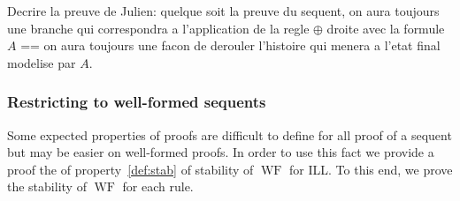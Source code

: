 \documentclass[runningheads,a4paper]{llncs}
\DeclareMathOperator{\wf}{WF}
\begin{document}
Decrire la preuve de Julien: quelque soit la preuve du sequent, on aura toujours une branche qui correspondra a l'application de la regle $\oplus$ droite avec la formule $A$ == on aura toujours une facon de derouler l'histoire qui menera a l'etat final modelise par $A$.

\subsubsection{Restricting to well-formed sequents}
\label{sec:restrict}

Some expected properties of proofs are difficult to define for all
proof of a sequent but may be easier on well-formed proofs. In order
to use this fact we provide a proof the of property~\ref{def:stab} of
stability of $\wf$ for ILL. To this end, we prove the stability of
$\wf$ for each rule.
\end{document}

